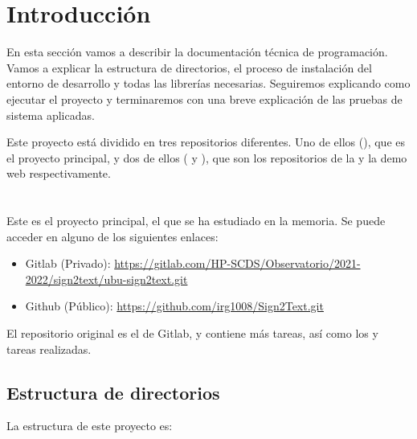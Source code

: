 
\section{Introducción}

En esta sección vamos a describir la documentación técnica de programación. Vamos a explicar la estructura de directorios, el proceso de instalación del entorno de desarrollo y todas las librerías necesarias. Seguiremos explicando como ejecutar el proyecto y terminaremos con una breve explicación de las pruebas de sistema aplicadas.

Este proyecto está dividido en tres repositorios diferentes. Uno de ellos (), que es el proyecto principal, y dos de ellos ( y ), que son los repositorios de la  y la demo web respectivamente.


\section{}

Este es el proyecto principal, el que se ha estudiado en la memoria. Se puede acceder en alguno de los siguientes enlaces:

\begin{itemize}
  \item Gitlab (Privado): \url{https://gitlab.com/HP-SCDS/Observatorio/2021-2022/sign2text/ubu-sign2text.git}
  \item Github (Público): \url{https://github.com/irg1008/Sign2Text.git}
\end{itemize}

El repositorio original es el de Gitlab, y contiene más tareas, así como los  y tareas realizadas.

\subsection{Estructura de directorios}

La estructura de este proyecto es:

